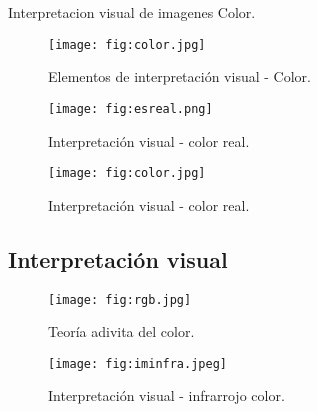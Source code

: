\begin{frame}{}
    \begin{block}{Interpretacion visual de imagenes}
     Color.

    \end{block}
\end{frame}

\begin{frame}{}
  \begin{figure}
    \centering
    \texttt{[image: fig:color.jpg]}
    \caption{Elementos de interpretación visual - Color.}
    \label{}
  \end{figure}
\end{frame}

\begin{frame}{}
  \begin{figure}
    \centering
    \texttt{[image: fig:esreal.png]}
    \caption{Interpretación visual - color real. }
    \label{}
  \end{figure}
\end{frame}

\begin{frame}{}
  \begin{figure}
    \centering
    \texttt{[image: fig:color.jpg]}
    \caption{Interpretación visual - color real.}
    \label{}
  \end{figure}
\end{frame}

\subsection{Interpretación visual}

\begin{frame}{}
  \begin{figure}
    \centering
    \texttt{[image: fig:rgb.jpg]}
    \caption{Teoría adivita del color.}
    \label{}
  \end{figure}
\end{frame}



\begin{frame}{}
  \begin{figure}
    \centering
    \texttt{[image: fig:iminfra.jpeg]}
    \caption{Interpretación visual - infrarrojo color.}
    \label{}
  \end{figure}
\end{frame}

